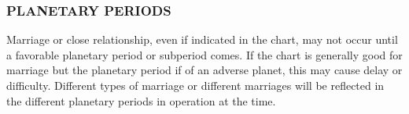  

\subsubsection{PLANETARY PERIODS}

 

Marriage or close relationship, even if indicated in the chart, may not occur until a favorable planetary period or subperiod comes. If the chart is generally good for marriage but the planetary period if of an adverse planet, this may cause delay or difficulty. Different types of marriage or different marriages will be reflected in the different planetary periods in operation at the time.

 


 

